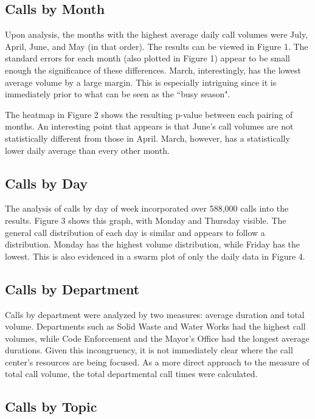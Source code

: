 \documentclass{article}
\begin{document}
	\subsection{Calls by Month}

Upon analysis, the months with the highest average daily call volumes were July, April, June, and May (in that order).  The results can be viewed in Figure 1.  The standard errors for each month (also plotted in Figure 1) appear to be small enough the significance of these differences.  March, interestingly, has the lowest average volume by a large margin.  This is especially intriguing since it is immediately prior to what can be seen as the ``busy season".

The heatmap in Figure 2 shows the resulting p-value between each pairing of months.  An interesting point that appears is that June's call volumes are not statistically different from those in April.  March, however, has a statistically lower daily average than every other month.


	\subsection{Calls by Day}

The analysis of calls by day of week incorporated over 588,000 calls into the results.  Figure 3 shows this graph, with Monday and Thursday visible.  The general call distribution of each day is similar and appears to follow a 
distribution.  Monday has the highest volume distribution, while Friday has the lowest.  This is also evidenced in a swarm plot of only the daily data in Figure 4.


	\subsection{Calls by Department}

Calls by department were analyzed by two measures:  average duration and total volume.  Departments such as Solid Waste and Water Works had the highest call volumes, while Code Enforcement and the Mayor's Office had the longest average durations.  Given this incongruency, it is not immediately clear where the call center's resources are being focused.  As a more direct approach to the measure of total call volume, the total departmental call times were calculated.


	\subsection{Calls by Topic}
\end{document}
